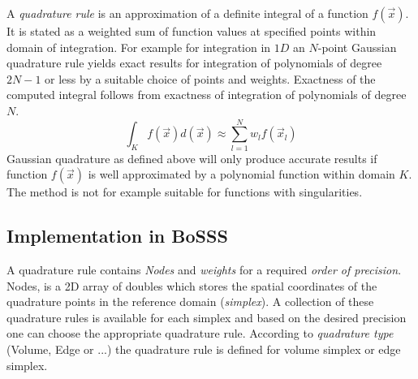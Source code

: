 \documentclass[BoSSSForSolvingConservationLaws.tex]{subfiles}
\begin{document}
A \emph{quadrature rule} is an approximation of a definite integral of a function $f(\vec{x})$. It is stated as a weighted sum of function values at specified points within domain of integration. For example for integration in $1D$ an $N$-point Gaussian quadrature rule yields exact results for integration of polynomials of degree $2N-1$ or less by a suitable choice of points and weights. Exactness of the computed integral follows from exactness of integration of polynomials of degree $N$.
\[
\int_K f(\vec{x}) d(\vec{x})\approx \sum_{l=1}^N w_l f(\vec{x}_l)
\]
Gaussian quadrature as defined above will only produce accurate results if function $f(\vec{x})$ is well approximated by a polynomial function within domain $K$. The method is not for example suitable for functions with singularities.

\begin{comment}
The domain of integration for such a rule in 1D is conventionally taken as [-1, 1].
However, if the integrand is $w(x)f(x)$ which $f(x)$ is a polynomial of order $2n-1$ and $p_n(x)$ is a class of orthogonal polynomials with respect to $w(x)$, then the evaluation points $x_i$ are roots of $p_n(x)$ in the interval $(-1,1)$ and the weights $w_i$ are $w(x_i)$.
\begin{align}
\int_{-1}^1 w(x)f(x)d(x)=\int_{-1}^1 w(x)[q(x)p_n(x)+r(x)]dx=\int_{-1}^1 w(x)r(x)d(x)\simeq \sum_{i=1}^n w_i r(x_i)
\end{align}
Therefore the exactness of the computed integral for $f(x)$ follows from corresponding exactness for polynomials of degree $n$ or less (as for $r(x)$).\\
\end{comment}

\subsection*{Implementation in BoSSS}
A quadrature rule contains \emph{Nodes} and \emph{weights} for a required \emph{order of precision}. Nodes, is a 2D array of doubles which stores the spatial coordinates of the quadrature points in the reference domain (\emph{simplex}). A collection of these quadrature rules is available for each simplex and based on the desired precision one can choose the appropriate quadrature rule. According to \emph{quadrature type} (Volume, Edge or ...) the quadrature rule is defined for volume simplex or edge simplex.\\
\end{document}
